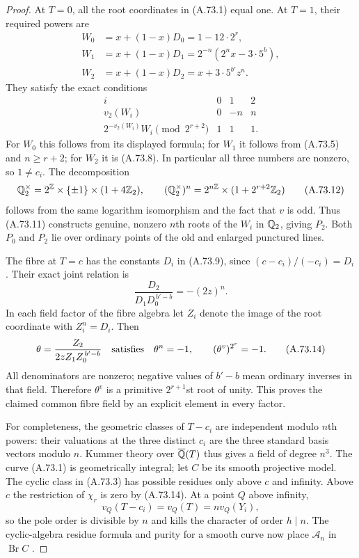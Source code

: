 \begin{proof}
At $T=0$, all the root coordinates in (A.73.1) equal one.
At $T=1$, their required powers are
\[
 \begin{split}
 W_0&=x+(1-x)D_0=1-12\cdot2^r,\\
 W_1&=x+(1-x)D_1
                    =2^{-n}(2^nx-3\cdot5^b),\\
 W_2&=x+(1-x)D_2=x+3\cdot5^{b'}z^n.
 \end{split}
       \tag{A.73.10}
\]
They satisfy the exact conditions
\[
 \begin{array}{c|ccc}
 i&0&1&2\\ \hline
 v_2(W_i)&0&-n&n\\
 2^{-v_2(W_i)}W_i\pmod{2^{r+2}}&1&1&1.
 \end{array}
       \tag{A.73.11}
\]
For $W_0$ this follows from its displayed formula; for $W_1$
it follows from (A.73.5) and $n\ge r+2$; for $W_2$ it is
(A.73.8).  In particular all three numbers are nonzero, so
$1\ne c_i$.
The decomposition
\[
 \mathbb Q_2^\times=2^\mathbb Z\times\{\pm1\}\times(1+4\mathbb Z_2),\qquad
 (\mathbb Q_2^\times)^n=2^{n\mathbb Z}\times(1+2^{r+2}\mathbb Z_2)
       \tag{A.73.12}
\]
follows from the same logarithm isomorphism and the fact that
$v$ is odd.  Thus (A.73.11) constructs genuine, nonzero
$n$th roots of the $W_i$ in $\mathbb Q_2$, giving $P_2$.
Both $P_0$ and $P_2$ lie over ordinary points of the old and
enlarged punctured lines.

The fibre at $T=c$ has the constants $D_i$ in (A.73.9), since
$(c-c_i)/(-c_i)=D_i$.  Their exact joint relation is
\[
             \frac{D_2}{D_1D_0^{\,b'-b}}=-(2z)^n.
       \tag{A.73.13}
\]
In each field factor of the fibre algebra let $Z_i$ denote
the image of the root coordinate with $Z_i^n=D_i$.  Then
\[
          \theta=\frac{Z_2}{2zZ_1Z_0^{\,b'-b}}
           \quad\hbox{satisfies}\quad
          \theta^n=-1,
          \qquad (\theta^v)^{2^r}=-1.
       \tag{A.73.14}
\]
All denominators are nonzero; negative values of $b'-b$ mean
ordinary inverses in that field.  Therefore $\theta^v$ is a
primitive $2^{r+1}$st root of unity.  This proves the claimed
common fibre field by an explicit element in every factor.

For completeness, the geometric classes of $T-c_i$ are
independent modulo $n$th powers: their valuations at the three
distinct $c_i$ are the three standard basis vectors modulo $n$.
Kummer theory over $\overline{\mathbb Q}(T)$ thus gives a field of degree
$n^3$.  The curve (A.73.1) is geometrically integral; let $C$
be its smooth projective model.  The cyclic class in (A.73.3)
has possible residues only above $c$ and infinity.  Above $c$
the restriction of $\chi_r$ is zero by (A.73.14).
At a point $Q$ above infinity,
\[
              v_Q(T-c_i)=v_Q(T)=n v_Q(Y_i),
       \tag{A.73.15}
\]
so the pole order is divisible by $n$ and kills the character
of order $h\mid n$.  The cyclic-algebra residue formula and
purity for a smooth curve now place $\mathcal A_n$ in
$\operatorname{Br}C$
\cite[\S1.4 and Corollary 3.7.3]{AgentCTSkoro2019}.


\end{proof}
